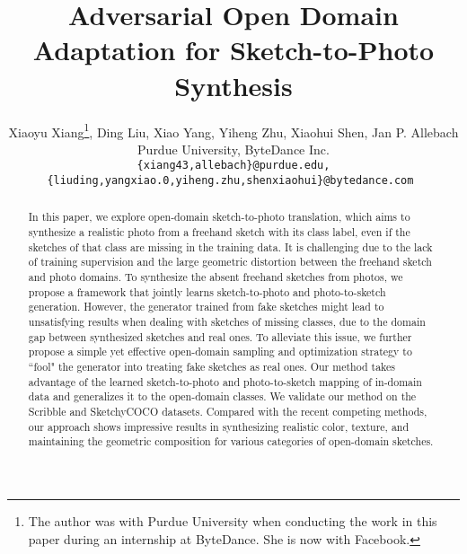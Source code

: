\documentclass[10pt,twocolumn,letterpaper]{article}
\begin{document}
\title{Adversarial Open Domain Adaptation for Sketch-to-Photo Synthesis}

\author{Xiaoyu Xiang\thanks{The author was with Purdue University when conducting the work in this paper during an internship at ByteDance. She is now with Facebook.},  Ding Liu,  Xiao Yang, Yiheng Zhu, Xiaohui Shen, Jan P. Allebach \\
Purdue University, ByteDance Inc. \\
 \tt\small \{xiang43,allebach\}@purdue.edu, \\
 \tt\small{\{liuding,yangxiao.0,yiheng.zhu,shenxiaohui\}@bytedance.com}
}

\maketitle



\begin{abstract}
   In this paper, we explore open-domain sketch-to-photo translation, which aims to synthesize a realistic photo from a freehand sketch with its class label, even if the sketches of that class are missing in the training data. It is challenging due to the lack of training supervision and the large geometric distortion between the freehand sketch and photo domains. To synthesize the absent freehand sketches from photos, we propose a framework that jointly learns sketch-to-photo and photo-to-sketch generation. However, the generator trained from fake sketches might lead to unsatisfying results when dealing with sketches of missing classes, due to the domain gap between synthesized sketches and real ones. To alleviate this issue, we further propose a simple yet effective open-domain sampling and optimization strategy to ``fool" the generator into treating fake sketches as real ones. Our method takes advantage of the learned sketch-to-photo and photo-to-sketch mapping of in-domain data and generalizes it to the open-domain classes. We validate our method on the Scribble and SketchyCOCO datasets. Compared with the recent competing methods, our approach shows impressive results in synthesizing realistic color, texture, and maintaining the geometric composition for various categories of open-domain sketches.
\end{abstract}
\end{document}
